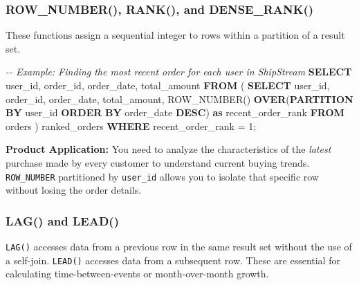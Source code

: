 \documentclass[
  11pt,
  openany,
  oneside]{book}
\newenvironment{Shaded}{}{}
\newcommand{\CommentTok}[1]{\textcolor[rgb]{0.38,0.63,0.69}{\textit{#1}}}
\newcommand{\DecValTok}[1]{\textcolor[rgb]{0.25,0.63,0.44}{#1}}
\newcommand{\FunctionTok}[1]{\textcolor[rgb]{0.02,0.16,0.49}{#1}}
\newcommand{\KeywordTok}[1]{\textcolor[rgb]{0.00,0.44,0.13}{\textbf{#1}}}
\newcommand{\NormalTok}[1]{#1}
\newcommand{\OperatorTok}[1]{\textcolor[rgb]{0.40,0.40,0.40}{#1}}
\begin{document}
\subsubsection{ROW\_NUMBER(), RANK(), and
DENSE\_RANK()}\label{row_number-rank-and-dense_rank}

These functions assign a sequential integer to rows within a partition
of a result set.

\begin{Shaded}
\begin{Highlighting}[]
\CommentTok{{-}{-} Example: Finding the most recent order for each user in ShipStream}
\KeywordTok{SELECT} 
\NormalTok{    user\_id,}
\NormalTok{    order\_id,}
\NormalTok{    order\_date,}
\NormalTok{    total\_amount}
\KeywordTok{FROM}\NormalTok{ (}
    \KeywordTok{SELECT} 
\NormalTok{        user\_id, }
\NormalTok{        order\_id, }
\NormalTok{        order\_date, }
\NormalTok{        total\_amount,}
        \FunctionTok{ROW\_NUMBER}\NormalTok{() }\KeywordTok{OVER}\NormalTok{(}\KeywordTok{PARTITION} \KeywordTok{BY}\NormalTok{ user\_id }\KeywordTok{ORDER} \KeywordTok{BY}\NormalTok{ order\_date }\KeywordTok{DESC}\NormalTok{) }\KeywordTok{as}\NormalTok{ recent\_order\_rank}
    \KeywordTok{FROM}\NormalTok{ orders}
\NormalTok{) ranked\_orders}
\KeywordTok{WHERE}\NormalTok{ recent\_order\_rank }\OperatorTok{=} \DecValTok{1}\NormalTok{;}
\end{Highlighting}
\end{Shaded}

\textbf{Product Application:} You need to analyze the characteristics of
the \emph{latest} purchase made by every customer to understand current
buying trends. \texttt{ROW\_NUMBER} partitioned by \texttt{user\_id}
allows you to isolate that specific row without losing the order
details.

\subsubsection{LAG() and LEAD()}\label{lag-and-lead}

\texttt{LAG()} accesses data from a previous row in the same result set
without the use of a self-join. \texttt{LEAD()} accesses data from a
subsequent row. These are essential for calculating time-between-events
or month-over-month growth.
\end{document}
